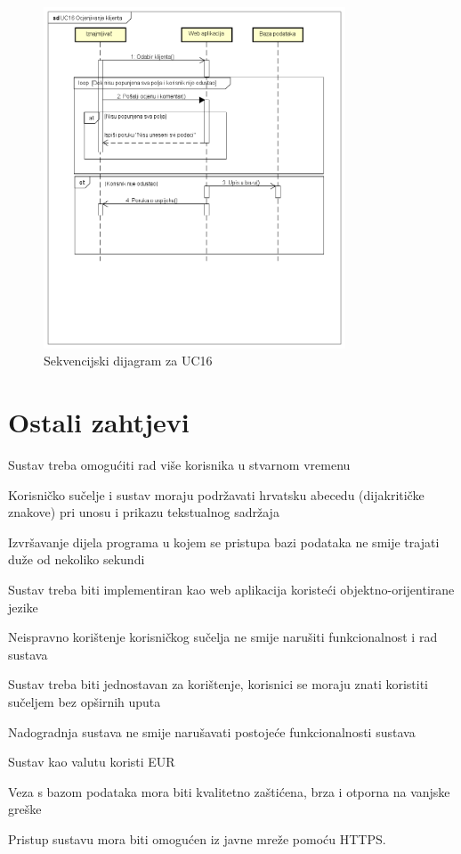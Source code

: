 				\begin{figure}[H]
					\centering
					\includegraphics[width=0.8\textwidth]{dijagrami/UC16_Ocjenjivanje_klijenta.png}
					\caption{Sekvencijski dijagram za UC16}
					\label{fig:your_label}
				\end{figure}
	
		\section{Ostali zahtjevi}
		
			\begin{packed_item} 
				\item Sustav treba omogućiti rad više korisnika u stvarnom vremenu
				\item Korisničko sučelje i sustav moraju podržavati hrvatsku abecedu (dijakritičke znakove) pri unosu i prikazu tekstualnog sadržaja
				\item Izvršavanje dijela programa u kojem se pristupa bazi podataka ne smije trajati duže od nekoliko sekundi 
				\item Sustav treba biti implementiran kao web aplikacija koristeći objektno-orijentirane jezike
				\item Neispravno korištenje korisničkog sučelja ne smije narušiti funkcionalnost i rad sustava
				\item
				Sustav treba biti jednostavan za korištenje, korisnici se moraju znati koristiti sučeljem bez opširnih uputa
				\item 
				Nadogradnja sustava ne smije narušavati postojeće funkcionalnosti sustava
				\item 
				Sustav kao valutu koristi EUR
				\item 
				Veza s bazom podataka mora biti kvalitetno zaštićena, brza i otporna na vanjske greške
				\item 
				Pristup sustavu mora biti omogućen iz javne mreže pomoću HTTPS.
			\end{packed_item}
			 
			 
			 
	